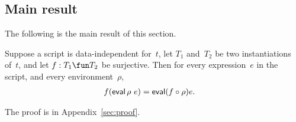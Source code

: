 









\subsection{Main result}

The following is the main result of this section.
%
\begin{prop}
\label{prop:expressions}
Suppose a script is data-independent for~$t$, let $T_1$ and~$T_2$ be two
instantiations of~$t$, and let $f : T_1 \fun T_2$ be surjective.  Then for
every expression~$e$ in the script, and every environment~$\rho$,
\begin{eqnarray*}
f(\mathop{\sf eval} \rho ~ e) & = \mathop{\sf eval} (f \circ \rho) e .
\end{eqnarray*}
\end{prop}
%
The proof is in Appendix~\ref{sec:proof}.
